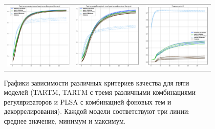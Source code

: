\begin{figure}
\begin{tabular}{ccc}
    \includegraphics[width=54mm]{images/CH4_improved_diversity_jensenshannon_False.eps} &   \includegraphics[width=54mm]{images/CH4_improved_diversity_jensenshannon_True.eps} & \includegraphics[width=54mm]{images/CH4_improved_SparsityThetaScore.eps} \\

\end{tabular}
    \caption{Графики зависимости различных критериев качества для пяти моделей (TARTM, TARTM с тремя различными комбинациями регуляризаторов и PLSA с комбинацией фоновых тем и декоррелирования). Каждой модели соответствуют три линии: среднее значение, минимум и максимум.}
\label{fig:ch4_improved}
\end{figure}

